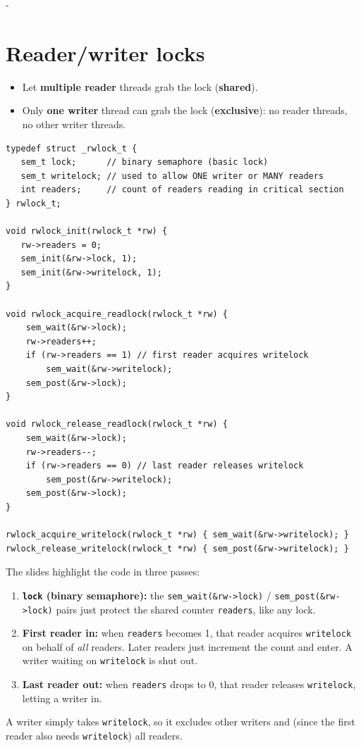\documentclass[11pt,a4paper]{article}
\makeatletter
\newcommand{\keepspace}[1]{\par\penalty-100\begingroup
  \setlength{\dimen@}{#1}\dimen@ii\pagegoal\advance\dimen@ii-\pagetotal
  \ifdim\dimen@>\dimen@ii\ifdim\dimen@ii>\z@\vfil\fi\break\fi\endgroup}
\makeatother
\begin{document}
\keepspace{30\baselineskip}
\section{Reader/writer locks}

\begin{defbox}[Goal]
\begin{itemize}
  \item Let \textbf{multiple reader} threads grab the lock (\textbf{shared}).
  \item Only \textbf{one writer} thread can grab the lock
        (\textbf{exclusive}): no reader threads, no other writer threads.
\end{itemize}
\end{defbox}

\begin{lstlisting}
typedef struct _rwlock_t {
   sem_t lock;      // binary semaphore (basic lock)
   sem_t writelock; // used to allow ONE writer or MANY readers
   int readers;     // count of readers reading in critical section
} rwlock_t;

void rwlock_init(rwlock_t *rw) {
   rw->readers = 0;
   sem_init(&rw->lock, 1);
   sem_init(&rw->writelock, 1);
}

void rwlock_acquire_readlock(rwlock_t *rw) {
    sem_wait(&rw->lock);
    rw->readers++;
    if (rw->readers == 1) // first reader acquires writelock
        sem_wait(&rw->writelock);
    sem_post(&rw->lock);
}

void rwlock_release_readlock(rwlock_t *rw) {
    sem_wait(&rw->lock);
    rw->readers--;
    if (rw->readers == 0) // last reader releases writelock
        sem_post(&rw->writelock);
    sem_post(&rw->lock);
}

rwlock_acquire_writelock(rwlock_t *rw) { sem_wait(&rw->writelock); }
rwlock_release_writelock(rwlock_t *rw) { sem_post(&rw->writelock); }
\end{lstlisting}

The slides highlight the code in three passes:
\begin{enumerate}
  \item \textbf{\texttt{lock} (binary semaphore):} the
        \texttt{sem\_wait(\&rw->lock)} / \texttt{sem\_post(\&rw->lock)} pairs
        just protect the shared counter \texttt{readers}, like any lock.
  \item \textbf{First reader in:} when \texttt{readers} becomes 1, that
        reader acquires \texttt{writelock} on behalf of \emph{all} readers.
        Later readers just increment the count and enter. A writer waiting
        on \texttt{writelock} is shut out.
  \item \textbf{Last reader out:} when \texttt{readers} drops to 0, that
        reader releases \texttt{writelock}, letting a writer in.
\end{enumerate}
A writer simply takes \texttt{writelock}, so it excludes other writers and
(since the first reader also needs \texttt{writelock}) all readers.
\end{document}

